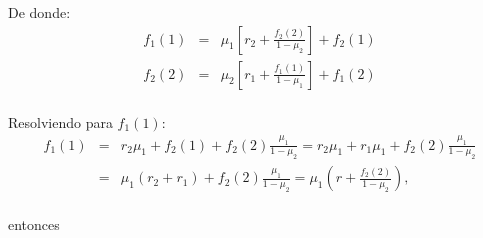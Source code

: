 De donde:
\begin{eqnarray*}
f_{1}\left(1\right)&=&\mu_{1}\left[r_{2}+\frac{f_{2}\left(2\right)}{1-\mu_{2}}\right]+f_{2}\left(1\right)\\
f_{2}\left(2\right)&=&\mu_{2}\left[r_{1}+\frac{f_{1}\left(1\right)}{1-\mu_{1}}\right]+f_{1}\left(2\right)\\
\end{eqnarray*}

Resolviendo para $f_{1}\left(1\right)$:
\begin{eqnarray*}
f_{1}\left(1\right)&=&r_{2}\mu_{1}+f_{2}\left(1\right)+f_{2}\left(2\right)\frac{\mu_{1}}{1-\mu_{2}}=r_{2}\mu_{1}+r_{1}\mu_{1}+f_{2}\left(2\right)\frac{\mu_{1}}{1-\mu_{2}}\\
&=&\mu_{1}\left(r_{2}+r_{1}\right)+f_{2}\left(2\right)\frac{\mu_{1}}{1-\mu_{2}}=\mu_{1}\left(r+\frac{f_{2}\left(2\right)}{1-\mu_{2}}\right),\\
\end{eqnarray*}

entonces

